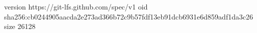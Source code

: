 version https://git-lfs.github.com/spec/v1
oid sha256:cb0244905aacda2e273ad366b72c9b57fdf13eb91dcb6931e6d859adf1da3c26
size 26128
